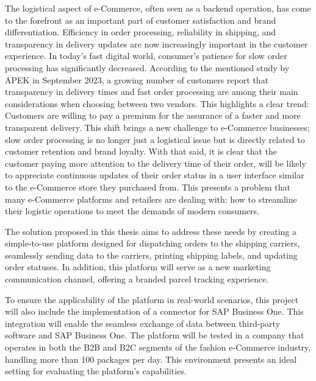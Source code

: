 The logistical aspect of e-Commerce, often seen as a backend operation, has come to the forefront as an important part of customer satisfaction and brand differentiation.
Efficiency in order processing, reliability in shipping, and transparency in delivery updates are now increasingly important in the customer experience.
In today's fast digital world, consumer's patience for slow order processing has significantly decreased.
According to the mentioned study by \ac{APEK} in September 2023, a growing number of customers report that transparency in delivery times and fast order processing are among their main considerations when choosing between two vendors.
This highlights a clear trend: Customers are willing to pay a premium for the assurance of a faster and more transparent delivery.
This shift brings a new challenge to e-Commerce businesses; slow order processing is no longer just a logistical issue but is directly related to customer retention and brand loyalty.
With that said, it is clear that the customer paying more attention to the delivery time of their order, will be likely to appreciate continuous updates of their order status in a user interface similar to the e-Commerce store they purchased from.
This presents a problem that many e-Commerce platforms and retailers are dealing with: how to streamline their logistic operations to meet the demands of modern consumers.

The solution proposed in this thesis aims to address these needs by creating a simple-to-use platform designed for dispatching orders to the shipping carriers, seamlessly sending data to the carriers, printing shipping labels, and updating order statuses.
In addition, this platform will serve as a new marketing communication channel, offering a branded parcel tracking experience.

To ensure the applicability of the platform in real-world scenarios, this project will also include the implementation of a connector for SAP Business One. This integration will enable the seamless exchange of data between third-party software and SAP Business One. The platform will be tested in a company that operates in both the \ac{B2B} and \ac{B2C} segments of the fashion e-Commerce industry, handling more than 100 packages per day. 
This environment presents an ideal setting for evaluating the platform's capabilities.


